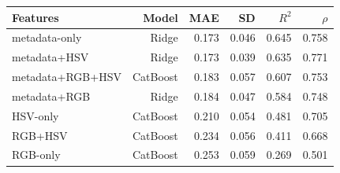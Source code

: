 \begin{tabular}{lrrrrr}
\toprule
Features & Model & MAE & SD &  $R^2$ & $\rho$ \\
\midrule
metadata-only & Ridge & 0.173 & 0.046 & 0.645 & 0.758 \\
metadata+HSV & Ridge & 0.173 & 0.039 & 0.635 & 0.771 \\
metadata+RGB+HSV & CatBoost & 0.183 & 0.057 & 0.607 & 0.753 \\
metadata+RGB & Ridge & 0.184 & 0.047 & 0.584 & 0.748 \\
HSV-only & CatBoost & 0.210 & 0.054 & 0.481 & 0.705 \\
RGB+HSV & CatBoost & 0.234 & 0.056 & 0.411 & 0.668 \\
RGB-only & CatBoost & 0.253 & 0.059 & 0.269 & 0.501 \\
\bottomrule
\end{tabular}
